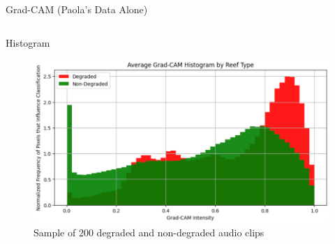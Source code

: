 \begin{frame}{Grad-CAM (Paola's Data Alone)}
\begin{columns}
        \begin{column}{0.33\textwidth}
            Histogram
            \begin{figure}
                \centering
                \includegraphics[width=\linewidth,keepaspectratio]{images/grad_cam_histogram.png}
                \caption{Sample of 200 degraded and non-degraded audio clips}
            \end{figure}
        \end{column}
    \end{columns}
\end{frame}

